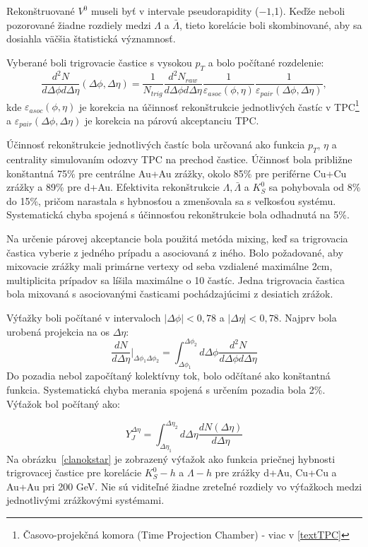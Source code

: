 \documentclass[thesismargins, thesislinespacing]{rnthesis}
\begin{document}
Rekonštruované $V^0$ museli byť v intervale pseudorapidity ($-1$,1). Keďže neboli pozorované žiadne rozdiely medzi $\Lambda$ a $\bar{\Lambda}$, tieto korelácie boli skombinované, aby sa dosiahla väčšia štatistická významnosť.

Vyberané boli trigrovacie častice s vysokou $p_T$ a bolo počítané rozdelenie:
\begin{equation}
\frac{d^2N}{d\Delta \phi d\Delta \eta}(\Delta\phi,\Delta\eta) = \frac{1}{N_{trig}}\frac{d^2N_{raw}}{d\Delta \phi d\Delta \eta}\frac{1}{\varepsilon_{asoc}(\phi,\eta)}\frac{1}{\varepsilon_{pair}(\Delta\phi,\Delta\eta)},
\end{equation}
kde $\varepsilon_{asoc}(\phi,\eta)$ je korekcia na účinnosť rekonštrukcie jednotlivých častíc v TPC\footnote{Časovo-projekčná komora (Time Projection Chamber) - viac v \ref{textTPC}} a $\varepsilon_{pair}(\Delta\phi,\Delta\eta)$ je korekcia na párovú akceptanciu TPC. 

Účinnosť rekonštrukcie jednotlivých častíc bola určovaná ako funkcia $p_T$, $\eta$ a centrality simulovaním odozvy TPC na prechod častice. Účinnosť bola približne konštantná 75\% pre centrálne Au+Au zrážky, okolo 85\% pre periférne Cu+Cu zrážky a 89\% pre d+Au. Efektivita rekonštrukcie $\Lambda, \bar{\Lambda}$ a $K^0_S$ sa pohybovala od 8\% do 15\%, pričom narastala s hybnosťou a zmenšovala sa s veľkosťou systému. Systematická chyba spojená s účinnosťou rekonštrukcie bola odhadnutá na 5\%.

Na určenie párovej akceptancie bola použitá metóda mixing, keď sa trigrovacia častica vyberie z jedného prípadu a asociovaná z iného. Bolo požadované, aby mixovacie zrážky mali primárne vertexy od seba vzdialené maximálne 2cm, multiplicita prípadov sa líšila maximálne o 10 častíc. Jedna trigrovacia častica bola mixovaná s asociovanými časticami pochádzajúcimi z desiatich zrážok.

Výťažky boli počítané v intervaloch $|\Delta\phi|<0,78$ a $|\Delta\eta|<0,78$. Najprv bola urobená projekcia na os $\Delta\eta$:
\begin{equation}
\frac{dN}{d\Delta\eta}|_{\Delta\phi_1 \Delta\phi_2}= \int_{\Delta\phi_1}^{\Delta\phi_2}d\Delta\phi \frac{d^2N}{d\Delta \phi d\Delta \eta}
\end{equation}
Do pozadia nebol započítaný kolektívny tok, bolo odčítané ako konštantná funkcia. Systematická chyba merania spojená s určením pozadia bola 2\%. Výťažok bol počítaný ako:

\begin{equation}
Y^{\Delta\eta}_J=\int_{\Delta\eta_1}^{\Delta\eta_2}d\Delta\eta \frac{dN(\Delta\eta)}{d\Delta\eta}
\end{equation}
Na obrázku~\ref{clanokstar} je zobrazený výťažok ako funkcia priečnej hybnosti trigrovacej častice pre korelácie $K_S^0 - h$ a $\Lambda-h$ pre zrážky d+Au, Cu+Cu a Au+Au pri 200 GeV. Nie sú viditeľné žiadne zreteľné rozdiely vo výťažkoch medzi jednotlivými zrážkovými systémami. 
\end{document}
